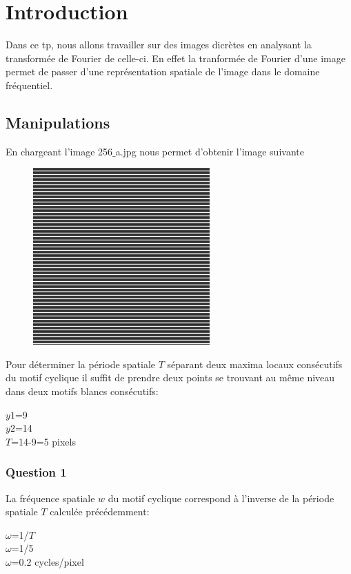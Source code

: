 \documentclass[a4paper,12pt]{report}
\begin{document}


\setcounter{page}{1} 
\newpage

\section*{Introduction}

Dans ce tp, nous allons travailler sur des images dicrètes en analysant la transformée de Fourier de celle-ci. En effet la tranformée de Fourier d'une image permet de passer d'une représentation spatiale de l'image dans le domaine fréquentiel.

\subsection*{Manipulations}

En chargeant l'image 256$\_$a.jpg nous permet d'obtenir l'image suivante
\begin{figure}[!ht]
	\center
	\includegraphics[scale=0.5]{image/256_a.jpg}
\end{figure}

Pour déterminer la période spatiale $T$ séparant deux maxima locaux consécutifs du motif cyclique il suffit de prendre deux points se trouvant au même niveau dans deux motifs blancs consécutifs:
\begin{center}
$y1$=9 \\
$y2$=14 \\
$T$=14-9=5 pixels 
\end{center}

\subsubsection*{Question 1}

La fréquence spatiale $w$ du motif cyclique correspond à l'inverse de la période spatiale $T$ calculée précédemment:
\begin{center}
$\omega$=1/$T$ \\
$\omega$=1/5 \\
$\omega$=0.2 cycles/pixel
\end{center} 
\end{document}
